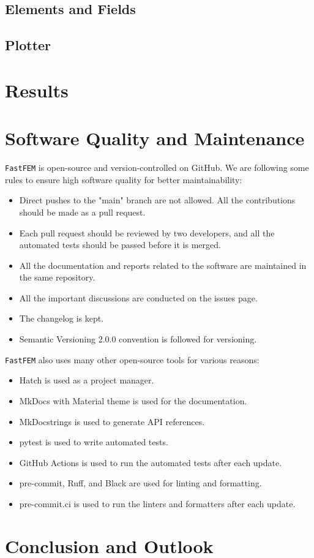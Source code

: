 \documentclass[headings=standardclasses, abstract=true]{scrartcl}
\begin{document}
\subsection{Elements and Fields}\label{sec:elem_field}

\subsection{Plotter}




\section{Results}

\section{Software Quality and Maintenance}

\texttt{FastFEM} is open-source and version-controlled on GitHub\supercite{fastfem}. We are following some rules to ensure high software quality for better maintainability:

\begin{itemize}
    \item Direct pushes to the "main" branch are not allowed. All the contributions should be made as a pull request.
    \item Each pull request should be reviewed by two developers, and all the automated tests should be passed before it is merged.
    \item All the documentation and reports related to the software are maintained in the same repository.
    \item All the important discussions are conducted on the issues page.
    \item The changelog is kept.
    \item Semantic Versioning 2.0.0\supercite{semanticVersioning} convention is followed for versioning.
\end{itemize}

\texttt{FastFEM} also uses many other open-source tools for various reasons:
\begin{itemize}
    \item Hatch\supercite{hatch} is used as a project manager.
    \item MkDocs\supercite{mkdocs} with Material theme\supercite{mkdocsmaterial} is used for the documentation.
    \item MkDocstrings\supercite{mkdocstrings} is used to generate API references.
    \item pytest\supercite{pytest} is used to write automated tests.
    \item GitHub Actions\supercite{githubactions} is used to run the automated tests after each update.
    \item pre-commit\supercite{precommit}, Ruff\supercite{ruff}, and Black\supercite{black} are used for linting and formatting.
    \item pre-commit.ci is used to run the linters and formatters after each update.
\end{itemize}


\section{Conclusion and Outlook}

\clearpage
\printbibliography
\end{document}
